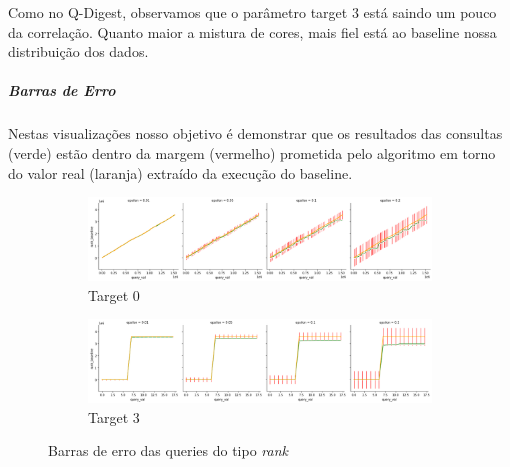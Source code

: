 \documentclass[11pt]{article}
\begin{document}
    Como no Q-Digest, observamos que o parâmetro target 3 está saindo um pouco da correlação. Quanto maior a mistura de cores, mais fiel está ao baseline nossa distribuição dos dados.
    \subparagraph{Barras de Erro}
    Nestas visualizações nosso objetivo é demonstrar que os resultados das consultas (verde) estão dentro da margem (vermelho) prometida pelo algoritmo em torno do valor real (laranja) extraído da execução do baseline.
    
    \begin{figure}[H]
      \begin{subfigure}{.5\textwidth}
        \centering
        \includegraphics[width=.9\linewidth]{../../img/qdigest-erroplot_ecdf_RANK_t_0.png}
        \caption{Target 0}
        \label{fig:sub-first}
      \end{subfigure}
      \begin{subfigure}{.5\textwidth}
        \centering
        \includegraphics[width=.9\linewidth]{../../img/qdigest-erroplot_ecdf_RANK_t_3.png}
        \caption{Target 3}
      \end{subfigure}
      \caption{Barras de erro das queries do tipo \emph{rank}}
    \end{figure}
    
\end{document}
